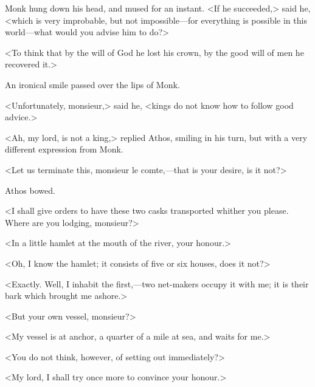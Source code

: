 Monk hung down his head, and mused for an instant. <If he succeeded,> said he, <which is very improbable, but not impossible—for everything is possible in this world—what would you advise him to do?>

<To think that by the will of God he lost his crown, by the good will of men he recovered it.>

An ironical smile passed over the lips of Monk.

<Unfortunately, monsieur,> said he, <kings do not know how to follow good advice.>

<Ah, my lord,  is not a king,> replied Athos, smiling in his turn, but with a very different expression from Monk.

<Let us terminate this, monsieur le comte,—that is your desire, is it not?>

Athos bowed.

<I shall give orders to have these two casks transported whither you please. Where are you lodging, monsieur?>

<In a little hamlet at the mouth of the river, your honour.>

<Oh, I know the hamlet; it consists of five or six houses, does it not?>

<Exactly. Well, I inhabit the first,—two net-makers occupy it with me; it is their bark which brought me ashore.>

<But your own vessel, monsieur?>

<My vessel is at anchor, a quarter of a mile at sea, and waits for me.>

<You do not think, however, of setting out immediately?>

<My lord, I shall try once more to convince your honour.>

